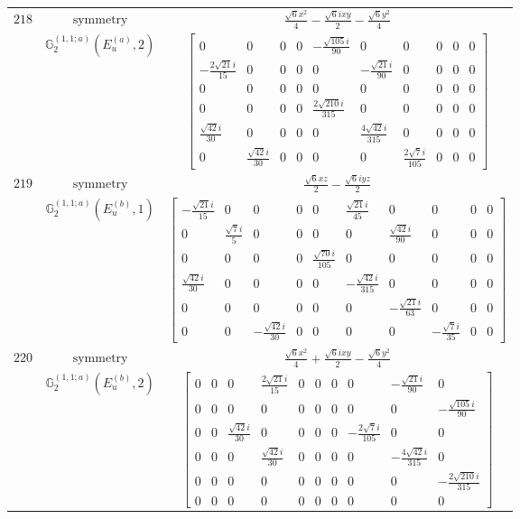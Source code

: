 \documentclass[fleqn,8pt,landscape]{jsarticle}
\begin{document}
\begin{longtable}{ccc}
$ 218 $ & $ \text{symmetry} $ & $ \frac{\sqrt{6} x^{2}}{4} - \frac{\sqrt{6} i x y}{2} - \frac{\sqrt{6} y^{2}}{4} $ \\
$  $ & $ \mathbb{G}_{2}^{(1,1;a)}(E_{u}^{(a)},2) $ & $ \begin{bmatrix} 0 & 0 & 0 & 0 & - \frac{\sqrt{105} i}{90} & 0 & 0 & 0 & 0 & 0 \\ - \frac{2 \sqrt{21} i}{15} & 0 & 0 & 0 & 0 & - \frac{\sqrt{21} i}{90} & 0 & 0 & 0 & 0 \\ 0 & 0 & 0 & 0 & 0 & 0 & 0 & 0 & 0 & 0 \\ 0 & 0 & 0 & 0 & \frac{2 \sqrt{210} i}{315} & 0 & 0 & 0 & 0 & 0 \\ \frac{\sqrt{42} i}{30} & 0 & 0 & 0 & 0 & \frac{4 \sqrt{42} i}{315} & 0 & 0 & 0 & 0 \\ 0 & \frac{\sqrt{42} i}{30} & 0 & 0 & 0 & 0 & \frac{2 \sqrt{7} i}{105} & 0 & 0 & 0 \end{bmatrix} $ \\ \hline
$ 219 $ & $ \text{symmetry} $ & $ \frac{\sqrt{6} x z}{2} - \frac{\sqrt{6} i y z}{2} $ \\
$  $ & $ \mathbb{G}_{2}^{(1,1;a)}(E_{u}^{(b)},1) $ & $ \begin{bmatrix} - \frac{\sqrt{21} i}{15} & 0 & 0 & 0 & 0 & \frac{\sqrt{21} i}{45} & 0 & 0 & 0 & 0 \\ 0 & \frac{\sqrt{7} i}{5} & 0 & 0 & 0 & 0 & \frac{\sqrt{42} i}{90} & 0 & 0 & 0 \\ 0 & 0 & 0 & 0 & \frac{\sqrt{70} i}{105} & 0 & 0 & 0 & 0 & 0 \\ \frac{\sqrt{42} i}{30} & 0 & 0 & 0 & 0 & - \frac{\sqrt{42} i}{315} & 0 & 0 & 0 & 0 \\ 0 & 0 & 0 & 0 & 0 & 0 & - \frac{\sqrt{21} i}{63} & 0 & 0 & 0 \\ 0 & 0 & - \frac{\sqrt{42} i}{30} & 0 & 0 & 0 & 0 & - \frac{\sqrt{7} i}{35} & 0 & 0 \end{bmatrix} $ \\ \hline
$ 220 $ & $ \text{symmetry} $ & $ \frac{\sqrt{6} x^{2}}{4} + \frac{\sqrt{6} i x y}{2} - \frac{\sqrt{6} y^{2}}{4} $ \\
$  $ & $ \mathbb{G}_{2}^{(1,1;a)}(E_{u}^{(b)},2) $ & $ \begin{bmatrix} 0 & 0 & 0 & \frac{2 \sqrt{21} i}{15} & 0 & 0 & 0 & 0 & - \frac{\sqrt{21} i}{90} & 0 \\ 0 & 0 & 0 & 0 & 0 & 0 & 0 & 0 & 0 & - \frac{\sqrt{105} i}{90} \\ 0 & 0 & \frac{\sqrt{42} i}{30} & 0 & 0 & 0 & 0 & - \frac{2 \sqrt{7} i}{105} & 0 & 0 \\ 0 & 0 & 0 & \frac{\sqrt{42} i}{30} & 0 & 0 & 0 & 0 & - \frac{4 \sqrt{42} i}{315} & 0 \\ 0 & 0 & 0 & 0 & 0 & 0 & 0 & 0 & 0 & - \frac{2 \sqrt{210} i}{315} \\ 0 & 0 & 0 & 0 & 0 & 0 & 0 & 0 & 0 & 0 \end{bmatrix} $ \\ \hline

\end{longtable}
\end{document}

